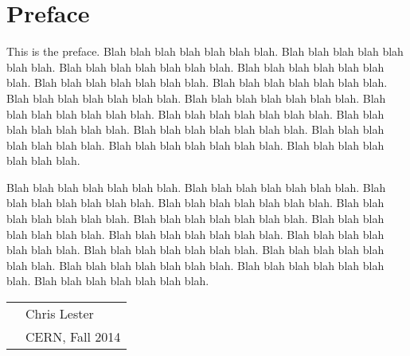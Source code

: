 
\chapter*{Preface}

This is the preface.  Blah blah blah blah blah blah blah.
Blah blah blah blah blah blah blah.  Blah blah blah blah blah blah blah.
Blah blah blah blah blah blah blah.  Blah blah blah blah blah blah blah.
Blah blah blah blah blah blah blah.  Blah blah blah blah blah blah blah.
Blah blah blah blah blah blah blah.  Blah blah blah blah blah blah blah.
Blah blah blah blah blah blah blah.  Blah blah blah blah blah blah blah.
Blah blah blah blah blah blah blah.  Blah blah blah blah blah blah blah.
Blah blah blah blah blah blah blah.  Blah blah blah blah blah blah blah.

Blah blah blah blah blah blah blah.  Blah blah blah blah blah blah blah.
Blah blah blah blah blah blah blah.  Blah blah blah blah blah blah blah.
Blah blah blah blah blah blah blah.  Blah blah blah blah blah blah blah.
Blah blah blah blah blah blah blah.  Blah blah blah blah blah blah blah.
Blah blah blah blah blah blah blah.  Blah blah blah blah blah blah blah.
Blah blah blah blah blah blah blah.  Blah blah blah blah blah blah blah.
Blah blah blah blah blah blah blah.  Blah blah blah blah blah blah blah.

\vspace{0.05\textheight}

\begin{tabular}{p{} l}
  & Chris Lester            \\
  & CERN, Fall 2014   \\
\end{tabular}


